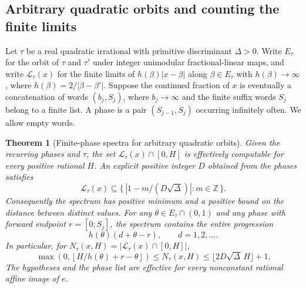 \documentclass[11pt]{amsart}
\newtheorem{theorem}{Theorem}[section]
\theoremstyle{definition}
\theoremstyle{remark}
\numberwithin{equation}{section}
\newcommand{\Z}{\mathbb{Z}}
\begin{document}
\subsection{Arbitrary quadratic orbits and counting the finite limits}
Let $\tau$ be a real quadratic irrational with primitive discriminant
$\Delta>0$. Write $E_\tau$ for the orbit of $\tau$ and $\tau'$ under
integer unimodular fractional-linear maps, and write
$\mathcal L_\tau(x)$ for the finite limits of
$h(\beta)|x-\beta|$ along $\beta\in E_\tau$ with $h(\beta)\to\infty$,
where $h(\beta)=2/|\beta-\beta'|$.
Suppose the continued fraction of $x$ is eventually a concatenation of
words $(b_j,S_j)$, where $b_j\to\infty$ and the finite suffix words $S_j$
belong to a finite list. A phase is a pair $(S_{j-1},S_j)$ occurring
infinitely often. We allow empty words.

\begin{theorem}[Finite-phase spectra for arbitrary quadratic orbits]\label{thm:general-quadratic-phase}
Given the recurring phases and $\tau$, the set
$\mathcal L_\tau(x)\cap[0,H]$ is effectively computable for every positive
rational $H$. An explicit positive integer $D$ obtained from the phases
satisfies
\[
 \mathcal L_\tau(x)\subseteq
 \{\,|1-m/(D\sqrt\Delta)|:m\in\Z\,\}.
\]
Consequently the spectrum has positive minimum and a positive bound on
the distance between distinct values. For any $\theta\in E_\tau\cap(0,1)$
and any phase with forward endpoint $r=[0;S_j]$, the spectrum contains
the entire progression
\[
 h(\theta)(d+\theta-r),\qquad d=1,2,\ldots .
\]
In particular, for $N_\tau(x,H)=|\mathcal L_\tau(x)\cap[0,H]|$,
\[
 \max\!\left(0,\left\lfloor H/h(\theta)+r-\theta\right\rfloor\right)
 \le N_\tau(x,H)\le \lfloor 2D\sqrt\Delta\,H\rfloor+1.
\]
The hypotheses and the phase list are effective for every nonconstant
rational affine image of $e$.
\end{theorem}
\end{document}
